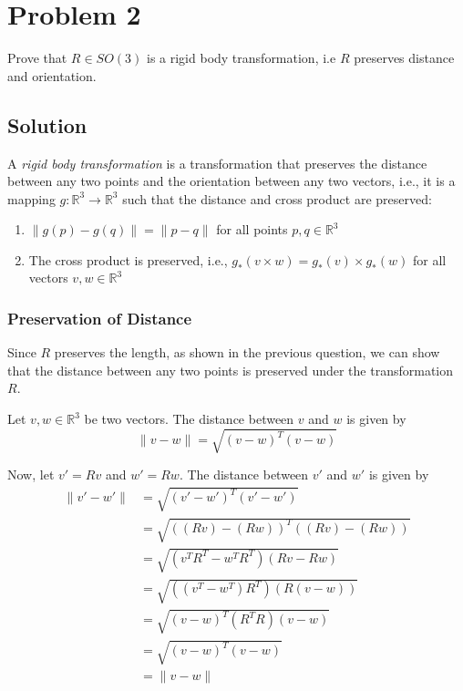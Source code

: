 \section*{Problem 2}

Prove that \(R \in S O(3)\) is a rigid body transformation, i.e \(R\) preserves distance and orientation.

\subsection*{Solution}

A \textit{rigid body transformation} is a transformation that preserves the distance between any two points and the orientation between any two vectors, i.e., it is a mapping \( g: \mathbb{R}^{3} \rightarrow \mathbb{R}^{3} \) such that the distance and cross product are preserved:
\begin{enumerate}
    \item \( \lVert g(p) - g(q) \rVert = \lVert p - q \rVert \) for all points \( p, q \in \mathbb{R}^{3} \)
    \item The cross product is preserved, i.e., \( g_{*}(v \times w) = g_{*}(v) \times g_{*}(w) \) for all vectors \( v, w \in \mathbb{R}^{3} \)
\end{enumerate}

\subsubsection*{Preservation of Distance}

Since \( R \) preserves the length, as shown in the previous question, we can show that the distance between any two points is preserved under the transformation \( R \).

Let \(v, w \in \mathbb{R}^{3}\) be two vectors. The distance between \(v\) and \(w\) is given by
\[
    \lVert v - w \rVert = \sqrt{{(v - w)}^{T}(v - w)}
\]

Now, let \(v' = R v\) and \(w' = R w\). The distance between \(v'\) and \(w'\) is given by
\begin{align*}
    \lVert v' - w' \rVert
     & = \sqrt{{(v' - w')}^{T}(v' - w')}
    \\ & = \sqrt{{((R v) - (R w))}^{T}((R v) - (R w))}
    \\ & = \sqrt{(v^{T} R^{T} - w^{T} R^{T})(R v - R w)}
    \\ & = \sqrt{((v^{T} - w^{T})R^{T}) (R(v - w))}
    \\ & = \sqrt{{(v - w)}^{T} (R^{T} R) (v - w)}
    \\ & = \sqrt{{(v - w)}^{T} (v - w)}
    \\ & = \lVert v - w \rVert
\end{align*}


